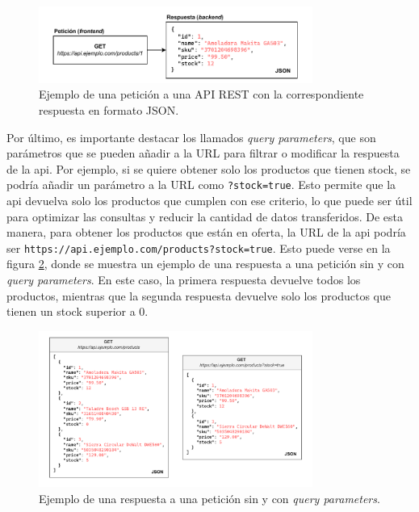 \begin{figure}[H]
    \centering
    \includegraphics[width=0.8\textwidth]{figures/theoric_frame/api_example.pdf}
    \caption{Ejemplo de una petición a una API REST con la correspondiente respuesta en formato JSON.}
    \label{fig:api_example}
\end{figure}

Por último, es importante destacar los llamados \textit{query parameters}, que son parámetros que se pueden añadir a la URL para filtrar o modificar la respuesta de la \gls{api}. Por ejemplo, si se quiere obtener solo los productos que tienen stock, se podría añadir un parámetro a la URL como \texttt{?stock=true}. Esto permite que la \gls{api} devuelva solo los productos que cumplen con ese criterio, lo que puede ser útil para optimizar las consultas y reducir la cantidad de datos transferidos. De esta manera, para obtener los productos que están en oferta, la URL de la \gls{api} podría ser \texttt{https://api.ejemplo.com/products?stock=true}. Esto puede verse en la figura \ref{fig:query_params_example}, donde se muestra un ejemplo de una respuesta a una petición sin y con \textit{query parameters}. En este caso, la primera respuesta devuelve todos los productos, mientras que la segunda respuesta devuelve solo los productos que tienen un stock superior a 0.

\begin{figure}[H]
    \centering
    \includegraphics[width=0.8\textwidth]{figures/theoric_frame/query_params_example.pdf}
    \caption{Ejemplo de una respuesta a una petición sin y con \textit{query parameters}.}
    \label{fig:query_params_example}
\end{figure}


